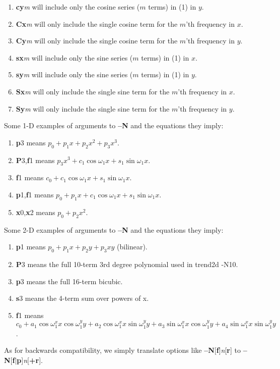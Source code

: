 \documentclass[12pt,letterpaper,margin=0.5in]{report}
\begin{document}
\begin{enumerate}
	\item {\bf cy}{\it m} will include only the cosine series ($m$ terms) in (1) in $y$.
	\item {\bf Cx}{\it m} will only include the single cosine term for the $m$'th frequency in $x$.
	\item {\bf Cy}{\it m} will only include the single cosine term for the $m$'th frequency in $y$.
	\item {\bf sx}{\it m} will include only the sine series ($m$ terms) in (1) in $x$.
	\item {\bf sy}{\it m} will include only the sine series ($m$ terms) in (1) in $y$.
	\item {\bf Sx}{\it m} will only include the single sine term for the $m$'th frequency in $x$.
	\item {\bf Sy}{\it m} will only include the single sine term for the $m$'th frequency in $y$.
\end{enumerate}
Some 1-D examples of arguments to {\bf --N} and the equations they imply:
\begin{enumerate}
	\item {\bf p}3 means $p_0 + p_1x + p_2x^2 + p_3x^3$.
	\item {\bf P}3,{\bf f}1 means $p_3x^3 + c_1\cos \omega_1 x + s_1 \sin \omega_1 x$.
	\item {\bf f}1 means $c_0 + c_1\cos \omega_1 x + s_1 \sin \omega_1 x$.
	\item {\bf p}1,{\bf f}1 means $p_0 + p_1x + c_1\cos \omega_1 x + s_1 \sin \omega_1 x$.
	\item {\bf x}0,{\bf x}2 means $p_0 + p_2x^2$.
\end{enumerate}
Some 2-D examples of arguments to {\bf --N} and the equations they imply:
\begin{enumerate}
	\item {\bf p}1 means $p_0 + p_1 x + p_2 y + p_3xy$ (bilinear).
	\item {\bf P}3 means the full 10-term 3rd degree polynomial used in trend2d -N10.
	\item {\bf p}3 means the full 16-term bicubic.
	\item {\bf s}3 means the 4-term sum over powers of x.
	\item {\bf f}1 means $c_0 + a_1\cos \omega^x_1 x \cos \omega ^y_1 y + a_2\cos \omega^x_1 x \sin \omega ^y_1 y + a_3\sin \omega^x_1 x \cos \omega ^y_1 y + a_4\sin \omega^x_1 x \sin \omega ^y_1 y$.
\end{enumerate}

As for backwards compatibility, we simply translate options like {\bf --N}[{\bf f}]{\it n}[{\bf r}] to {\bf --N}[{\bf f}$|${\bf p}]{\it n}[{\bf +r}].
\end{document}
